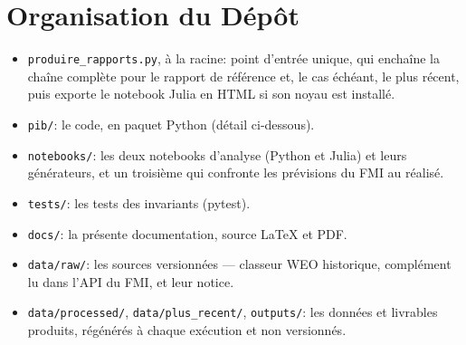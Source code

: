 \documentclass[11pt,a4paper]{article}
\begin{document}
\section{Organisation du Dépôt}

\begin{itemize}
    \item \texttt{produire\_rapports.py}, à la racine: point d'entrée unique, qui enchaîne la chaîne complète pour le rapport de référence et, le cas échéant, le plus récent, puis exporte le notebook Julia en HTML si son noyau est installé.
    \item \texttt{pib/}: le code, en paquet Python (détail ci-dessous).
    \item \texttt{notebooks/}: les deux notebooks d'analyse (Python et Julia) et leurs générateurs, et un troisième qui confronte les prévisions du FMI au réalisé.
    \item \texttt{tests/}: les tests des invariants (pytest).
    \item \texttt{docs/}: la présente documentation, source \LaTeX{} et PDF.
    \item \texttt{data/raw/}: les sources versionnées --- classeur WEO historique, complément lu dans l'API du FMI, et leur notice.
    \item \texttt{data/processed/}, \texttt{data/plus\_recent/}, \texttt{outputs/}: les données et livrables produits, régénérés à chaque exécution et non versionnés.
\end{itemize}
\end{document}
